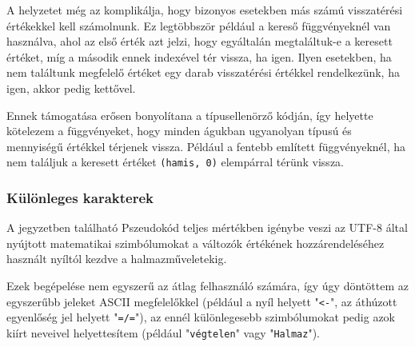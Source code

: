 A helyzetet még az komplikálja, hogy bizonyos esetekben más számú visszatérési értékekkel kell számolnunk. Ez legtöbbször például a kereső függvényeknél van használva, ahol az első érték azt jelzi, hogy egyáltalán megtaláltuk-e a keresett értéket, míg a második ennek indexével tér vissza, ha igen. Ilyen esetekben, ha nem találtunk megfelelő értéket egy darab visszatérési értékkel rendelkezünk, ha igen, akkor pedig kettővel.

Ennek támogatása erősen bonyolítana a típusellenörző kódján, így helyette kötelezem a függvényeket, hogy minden águkban ugyanolyan típusú és mennyiségű értékkel térjenek vissza. Például a fentebb említett függvényeknél, ha nem találjuk a keresett értéket \texttt{(hamis, 0)} elempárral térünk vissza.

\subsubsection{Különleges karakterek}

A jegyzetben található Pszeudokód teljes mértékben igénybe veszi az UTF-8 által nyújtott matematikai szimbólumokat a változók értékének hozzárendeléséhez használt nyíltól kezdve a halmazműveletekig.

Ezek begépelése nem egyszerű az átlag felhasználó számára, így úgy döntöttem az egyszerűbb jeleket ASCII megfelelőkkel (például a nyíl helyett "\texttt{<-}", az áthúzott egyenlőség jel helyett "\texttt{=/=}"), az ennél különlegesebb szimbólumokat pedig azok kiírt neveivel helyettesítem (például "\texttt{végtelen}" vagy "\texttt{Halmaz}").